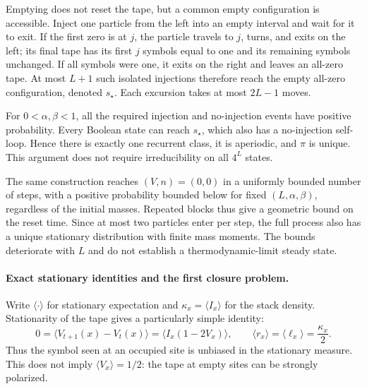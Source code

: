 \documentclass{article}
\begin{document}
Emptying does not reset the tape, but a common empty configuration is
accessible.  Inject one particle from the left into an empty interval and
wait for it to exit.  If the first zero is at $j$, the particle travels to
$j$, turns, and exits on the left; its final tape has its first $j$ symbols
equal to one and its remaining symbols unchanged.  If all symbols were one,
it exits on the right and leaves an all-zero tape.  At most $L+1$ such
isolated injections therefore reach the empty all-zero configuration,
denoted $s_\star$.  Each excursion takes at most $2L-1$ moves.

For $0<\alpha,\beta<1$, all the required injection and no-injection events
have positive probability.  Every Boolean state can reach $s_\star$, which
also has a no-injection self-loop.  Hence there is exactly one recurrent
class, it is aperiodic, and $\pi$ is unique.  This argument does not require
irreducibility on all $4^L$ states.

The same construction reaches $(V,n)=(0,0)$ in a uniformly bounded number
of steps, with a positive probability bounded below for fixed
$(L,\alpha,\beta)$, regardless of the initial masses.  Repeated blocks thus
give a geometric bound on the reset time.  Since at most two particles
enter per step, the full process also has a unique stationary distribution
with finite mass moments.  The bounds deteriorate with $L$ and do not
establish a thermodynamic-limit steady state.

\paragraph{Exact stationary identities and the first closure problem.}
Write $\langle\cdot\rangle$ for stationary expectation and
$\kappa_x=\langle I_x\rangle$ for the stack density.  Stationarity of the
tape gives a particularly simple identity:
\begin{equation}
0=\langle V_{t+1}(x)-V_t(x)\rangle
 =\langle I_x(1-2V_x)\rangle,
\qquad
\boxed{\langle r_x\rangle=\langle\ell_x\rangle=\frac{\kappa_x}{2}.}
\label{eq:stationary-rotor-balance}
\end{equation}
Thus the symbol seen at an occupied site is unbiased in the stationary
measure.  This does not imply $\langle V_x\rangle=1/2$: the tape at empty
sites can be strongly polarized.
\end{document}
